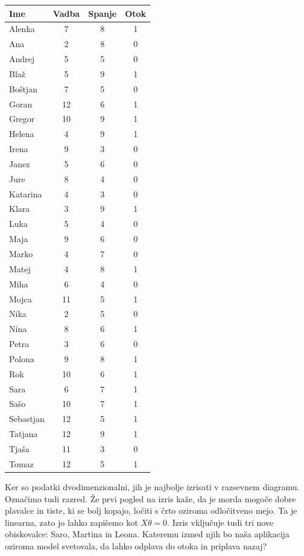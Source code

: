 \begin{marginfigure}
\caption{Primer klasifikacijskih podatkov z meta atributum, neodvisnima spremenljivkama in razredom (Otok).}
\label{tab:bled}
\footnotesize
\centering
\begin{tabular}{lccc}
\toprule
Ime & Vadba & Spanje & Otok \\
\midrule
Alenka     & 7  & 8 & 1 \\
Ana        & 2  & 8 & 0 \\
Andrej     & 5  & 5 & 0 \\
Blaž       & 5  & 9 & 1 \\
Boštjan    & 7  & 5 & 0 \\
Goran      & 12 & 6 & 1 \\
Gregor     & 10 & 9 & 1 \\
Helena     & 4  & 9 & 1 \\
Irena      & 9  & 3 & 0 \\
Janez      & 5  & 6 & 0 \\
Jure       & 8  & 4 & 0 \\
Katarina   & 4  & 3 & 0 \\
Klara      & 3  & 9 & 1 \\
Luka       & 5  & 4 & 0 \\
Maja       & 9  & 6 & 0 \\
Marko      & 4  & 7 & 0 \\
Matej      & 4  & 8 & 1 \\
Miha       & 6  & 4 & 0 \\
Mojca      & 11 & 5 & 1 \\
Nika       & 2  & 5 & 0 \\
Nina       & 8  & 6 & 1 \\
Petra      & 3  & 6 & 0 \\
Polona     & 9  & 8 & 1 \\
Rok        & 10 & 6 & 1 \\
Sara       & 6  & 7 & 1 \\
Sašo       & 10 & 7 & 1 \\
Sebastjan  & 12 & 5 & 1 \\
Tatjana    & 12 & 9 & 1 \\
Tjaša      & 11 & 3 & 0 \\
Tomaz      & 12 & 5 & 1 \\
\bottomrule
\end{tabular}
\end{marginfigure}

Ker so podatki dvodimenzionalni, jih je najbolje izrisati v razsevnem diagramu. Označimo tudi razred. Že prvi pogled na izris kaže, da je morda mogoče dobre plavalce in tiste, ki se bolj kopajo, ločiti s črto oziroma odločitveno mejo. Ta je linearna, zato jo lahko zapišemo kot $X\theta = 0$. Izris vključuje tudi tri nove obiskovalce: Saro, Martina in Leona. Kateremu izmed njih bo naša aplikacija oziroma model svetovala, da lahko odplava do otoka in priplava nazaj?

